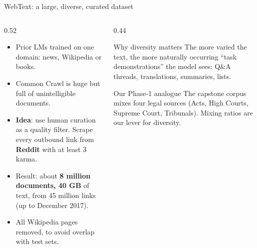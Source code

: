 \documentclass[aspectratio=169,11pt]{beamer}
\begin{document}
\begin{frame}{WebText: a large, diverse, curated dataset}
  \begin{columns}[T]
    \begin{column}{0.52\textwidth}
      \small
      \begin{itemize}
        \item Prior LMs trained on one domain: news, Wikipedia or books.
        \item Common Crawl is huge but full of unintelligible documents.
        \item \textbf{Idea}: use human curation as a quality filter. Scrape every outbound link from \textbf{Reddit} with at least 3 karma.
        \item Result: about \textbf{8 million documents, 40 GB} of text, from 45 million links (up to December 2017).
        \item All Wikipedia pages removed, to avoid overlap with test sets.
      \end{itemize}
    \end{column}
    \begin{column}{0.44\textwidth}
      \begin{exampleblock}{Why diversity matters}
        \small
        The more varied the text, the more naturally occurring ``task demonstrations'' the model sees: Q\&A threads, translations, summaries, lists.
      \end{exampleblock}
      \begin{block}{Our Phase-1 analogue}
        \small
        The capstone corpus mixes four legal sources (Acts, High Courts, Supreme Court, Tribunals). Mixing ratios are our lever for diversity.
      \end{block}
    \end{column}
  \end{columns}
\end{frame}
\end{document}
